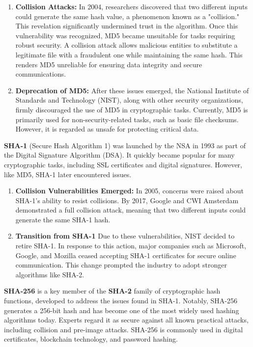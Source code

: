 \documentclass[11pt,a4paper]{article}
\begin{document}
    \begin{enumerate}
        \item \textbf{Collision Attacks:} In 2004, researchers discovered that two different inputs could generate the same hash value, a phenomenon known as a "collision." This revelation significantly undermined trust in the algorithm. Once this vulnerability was recognized, MD5 became unsuitable for tasks requiring robust security. A collision attack allows malicious entities to substitute a legitimate file with a fraudulent one while maintaining the same hash. This renders MD5 unreliable for ensuring data integrity and secure communications.
        
        \item \textbf{Deprecation of MD5:} After these issues emerged, the National Institute of Standards and Technology (NIST), along with other security organizations, firmly discouraged the use of MD5 in cryptographic tasks. Currently, MD5 is primarily used for non-security-related tasks, such as basic file checksums. However, it is regarded as unsafe for protecting critical data.

    \end{enumerate}

        \textbf{SHA-1} (Secure Hash Algorithm 1) was launched by the NSA in 1993 as part of the Digital Signature Algorithm (DSA). It quickly became popular for many cryptographic tasks, including SSL certificates and digital signatures. However, like MD5, SHA-1 later encountered issues.
        
        \begin{enumerate}
            \item \textbf{Collision Vulnerabilities Emerged:} In 2005, concerns were raised about SHA-1’s ability to resist collisions. By 2017, Google and CWI Amsterdam demonstrated a full collision attack, meaning that two different inputs could generate the same SHA-1 hash.

            \item \textbf{Transition from SHA-1} Due to these vulnerabilities, NIST decided to retire SHA-1. In response to this action, major companies such as Microsoft, Google, and Mozilla ceased accepting SHA-1 certificates for secure online communication. This change prompted the industry to adopt stronger algorithms like SHA-2.

        \end{enumerate}

        \textbf{SHA-256} is a key member of the \textbf{SHA-2} family of cryptographic hash functions, developed to address the issues found in SHA-1. Notably, SHA-256 generates a 256-bit hash and has become one of the most widely used hashing algorithms today. Experts regard it as secure against all known practical attacks, including collision and pre-image attacks. SHA-256 is commonly used in digital certificates, blockchain technology, and password hashing.
    
\end{document}
